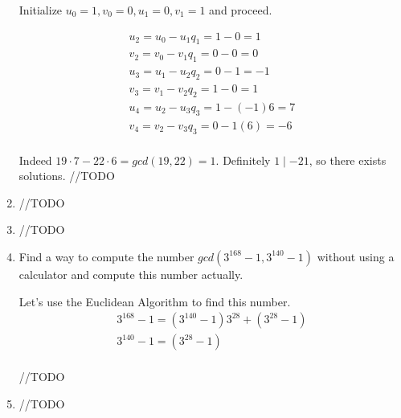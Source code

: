\documentclass{article}
\begin{document}
\begin{enumerate}
Initialize $u_0=1,v_0=0,u_1=0,v_1=1$ and proceed.

\begin{align*}
u_2=u_0-u_1q_1=1-0=1\\
v_2=v_0-v_1q_1=0-0=0\\
u_3=u_1-u_2q_2=0-1=-1\\
v_3=v_1-v_2q_2=1-0=1\\
u_4=u_2-u_3q_3=1-(-1)6=7\\
v_4=v_2-v_3q_3=0-1(6)=-6\\
\end{align*}

Indeed $19\cdot7-22\cdot6=gcd(19,22)=1$. Definitely $1 \mid -21$, so there exists solutions.
//TODO

\item //TODO
\item //TODO
\item Find a way to compute the number $gcd(3^{168}-1,3^{140}-1)$ without using a calculator and compute this number actually.
\newline

Let's use the Euclidean Algorithm to find this number.
\begin{align*}
3^{168}-1=(3^{140}-1)3^{28}+(3^{28}-1)\\
3^{140}-1=(3^{28}-1)\\
\end{align*}

//TODO

\item //TODO
\end{enumerate}
\end{document}
